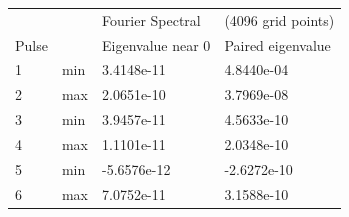 \documentclass[12pt]{article}
\begin{document}
\begin{figure}[H]
\begin{tabular}{ll|ll}
      &     & Fourier Spectral  & (4096 grid points) \\
Pulse &     & Eigenvalue near 0 & Paired eigenvalue  \\ \hline
1     & min & 3.4148e-11        & 4.8440e-04         \\
2     & max & 2.0651e-10        & 3.7969e-08         \\
3     & min & 3.9457e-11        & 4.5633e-10         \\
4     & max & 1.1101e-11        & 2.0348e-10         \\
5     & min & -5.6576e-12       & -2.6272e-10        \\
6     & max & 7.0752e-11        & 3.1588e-10        
\end{tabular}
\end{figure}
\end{document}
